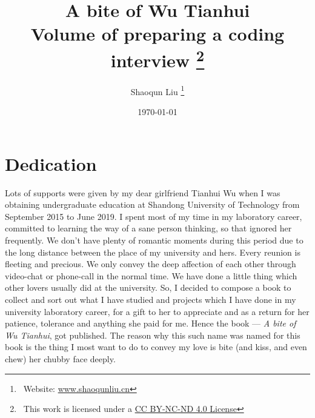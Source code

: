 \documentclass[a4paper]{report}
\begin{document}
\title{
    \Huge \bfseries A bite of Wu Tianhui\\
    \bigskip
    \Large Volume of preparing a coding interview
    \footnote{~This work is licensed under a \href{https://creativecommons.org/licenses/by-nc-nd/4.0/}{CC BY-NC-ND 4.0 License}}
}

\author{Shaoqun Liu \footnote{~Website: \url{www.shaoqunliu.cn}}}
\date{\today}
\maketitle

\chapter*{Dedication}

\begin{quote}
    \medskip
\end{quote}

Lots of supports were given by my dear girlfriend Tianhui Wu when I was obtaining undergraduate education at Shandong University of Technology from September 2015 to June 2019. I spent most of my time in my laboratory career, committed to learning the way of a sane person thinking, so that ignored her frequently. We don't have plenty of romantic moments during this period due to the long distance between the place of my university and hers. Every reunion is fleeting and precious. We only convey the deep affection of each other through video-chat or phone-call in the normal time. We have done a little thing which other lovers usually did at the university. So, I decided to compose a book to collect and sort out what I have studied and projects which I have done in my university laboratory career, for a gift to her to appreciate and as a return for her patience, tolerance and anything she paid for me. Hence the book --- \textsl{A bite of Wu Tianhui}, got published. The reason why this such name was named for this book is the thing I most want to do to convey my love is bite (and kiss, and even chew) her chubby face deeply. \\

\end{document}
